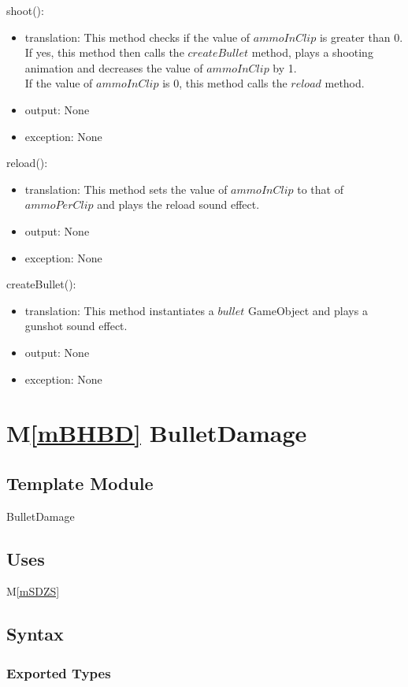 \documentclass[12pt]{article}
\newcommand{\mref}[1]{M\ref{#1}}
\begin{document}
\noindent shoot():
\begin{itemize}
	\item translation: This method checks if the value of $ammoInClip$ is greater than 0. If yes, this method then calls the $createBullet$ method, plays a shooting animation and decreases the value of $ammoInClip$ by 1.\\ 
	If the value of $ammoInClip$ is 0, this method calls the $reload$ method.
	\item output: None
	\item exception: None
\end{itemize}

\noindent reload():
\begin{itemize}
	\item translation: This method sets the value of $ammoInClip$ to that of $ammoPerClip$ and plays the reload sound effect.
	\item output: None
	\item exception: None
\end{itemize}

\noindent createBullet():
\begin{itemize}
	\item translation: This method instantiates a $bullet$ GameObject and plays a gunshot sound effect.
	\item output: None
	\item exception: None
\end{itemize}

\newpage
\section*{\mref{mBHBD} BulletDamage}

\subsection*{Template Module}

BulletDamage

\subsection* {Uses}

\mref{mSDZS}

\subsection* {Syntax}

\subsubsection* {Exported Types}
\end{document}
